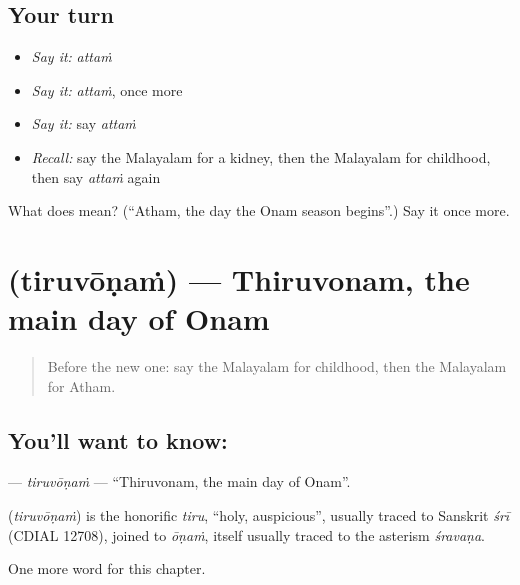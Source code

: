 \subsection*{Your turn}
\begin{itemize}
\raggedright
  \item \emph{Say it:} \emph{attaṁ}
  \item \emph{Say it:} \emph{attaṁ}, once more
  \item \emph{Say it:} say \emph{attaṁ}
  \item \emph{Recall:} say the Malayalam for a kidney, then the Malayalam for childhood, then say \emph{attaṁ} again
\end{itemize}

\begin{tcolorbox}[breakable,colback=teal!4,colframe=teal!35!black,title={Before you move on}]
What does  mean? (\textquotedblleft{}Atham, the day the Onam season begins\textquotedblright{}.) Say it once more.
\end{tcolorbox}
\section[\texorpdfstring{\ml{തിരുവോണം} (tiruvōṇaṁ)}{തിരുവോണം (tiruvōṇaṁ)}]{ (tiruvōṇaṁ) — Thiruvonam, the main day of Onam}

\label{lesson:ML-C236-tiruvonam}



\begin{quote}
Before the new one: say the Malayalam for childhood, then the Malayalam for Atham.
\end{quote}

\subsection*{You'll want to know: }
\textbf{} — \emph{tiruvōṇaṁ} — \textquotedblleft{}Thiruvonam, the main day of Onam\textquotedblright{}.

\begin{cousinweb}
\textbf{} (\emph{tiruvōṇaṁ}) is the honorific \emph{tiru}, \textquotedblleft{}holy, auspicious\textquotedblright{}, usually traced to Sanskrit \emph{śrī} (CDIAL 12708), joined to \emph{ōṇaṁ}, itself usually traced to the asterism \emph{śravaṇa}.
\end{cousinweb}

\begin{grammarlens}[title={What you've built}]
One more word for this chapter.
\end{grammarlens}

